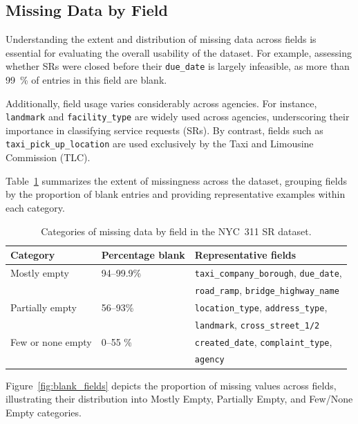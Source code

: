 \documentclass[linenumber]{jdsart}
\begin{document}
\subsection{Missing Data by Field}
\label{subsec:blanks}
Understanding the extent and distribution of missing data across fields 
is essential for evaluating the overall usability of the dataset. 
For example, assessing whether SRs were closed before 
their \texttt{due\_date} is largely infeasible, as more than 
\SI{99}{\percent} of entries in this field are blank.  

Additionally, field usage  varies considerably across agencies.
For instance, \texttt{landmark} and \texttt{facility\_type} are 
widely used across agencies, underscoring their importance in 
classifying service requests (SRs). 
By contrast, fields such as \texttt{taxi\_pick\_up\_location} are used 
exclusively by the Taxi and Limousine Commission (\textsc{TLC}). 

Table~\ref{tab:missing-data} summarizes the extent of missingness across 
the dataset, grouping fields by the proportion of blank entries and 
providing representative examples within each category.

\begin{table}[tbp]
  \centering
  \caption{Categories of missing data by field in the NYC~311 SR dataset.}
  \label{tab:missing-data}
  \small
  \begin{tabular}{lll}
    \toprule
    \textbf{Category} & \textbf{Percentage blank} & \textbf{Representative fields} \\
    \midrule
    Mostly empty      & 94--99.9\%   & \texttt{taxi\_company\_borough}, \texttt{due\_date}, \\
                      &              & \texttt{road\_ramp}, \texttt{bridge\_highway\_name} \\
    Partially empty   & 56--93\%      & \texttt{location\_type}, \texttt{address\_type}, \\
                      &              & \texttt{landmark}, \texttt{cross\_street\_1/2} \\
    Few or none empty & 0--55 \%       & \texttt{created\_date}, \texttt{complaint\_type}, \\
                      &              & \texttt{agency} \\
    \bottomrule
  \end{tabular}
\end{table}

Figure~\ref{fig:blank_fields} depicts the proportion of missing values 
across fields, illustrating their distribution into Mostly Empty, 
Partially Empty, and Few/None Empty categories.
\end{document}
